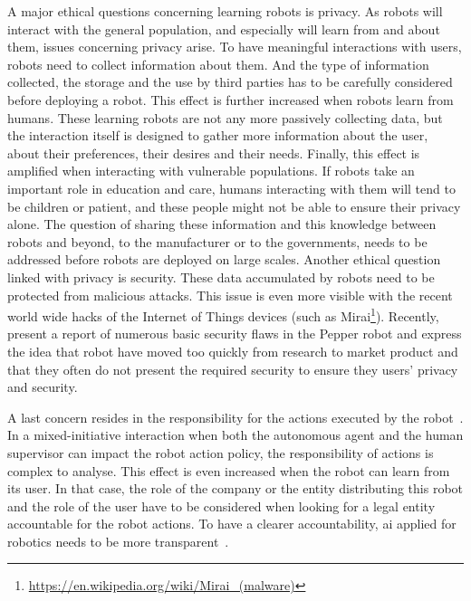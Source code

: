 A major ethical questions concerning learning robots is privacy. As robots will interact with the general population, and especially will learn from and about them, issues concerning privacy arise. To have meaningful interactions with users, robots need to collect information about them. And the type of information collected, the storage and the use by third parties has to be carefully considered before deploying a robot. This effect is further increased when robots learn from humans. These learning robots are not any more passively collecting data, but the interaction itself is designed to gather more information about the user, about their preferences, their desires and their needs. Finally, this effect is amplified when interacting with vulnerable populations. If robots take an important role in education and care, humans interacting with them will tend to be children or patient, and these people might not be able to ensure their privacy alone. The question of sharing these information and this knowledge between robots and beyond, to the manufacturer or to the governments, needs to be addressed before robots are deployed on large scales. Another ethical question linked with privacy is security. These data accumulated by robots need to be protected from malicious attacks. This issue is even more visible with the recent world wide hacks of the Internet of Things devices (such as Mirai\footnote{\url{https://en.wikipedia.org/wiki/Mirai_(malware)}}). Recently, \cite{giaretta2018adding} present a report of numerous basic security flaws in the Pepper robot and express the idea that robot have moved too quickly from research to market product and that they often do not present the required security to ensure they users' privacy and security.

A last concern resides in the responsibility for the actions executed by the robot~\citep{asaro2007robots}. In a mixed-initiative interaction when both the autonomous agent and the human supervisor can impact the robot action policy, the responsibility of actions is complex to analyse. This effect is even increased when the robot can learn from its user. In that case, the role of the company or the entity distributing this robot and the role of the user have to be considered when looking for a legal entity accountable for the robot actions. To have a clearer accountability, \gls{ai} applied for robotics needs to be more transparent~\citep{wachter2017transparent}.

